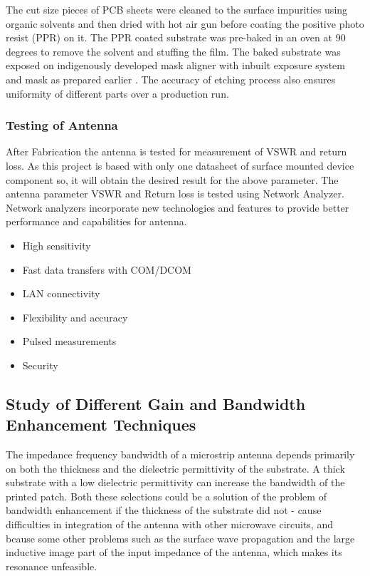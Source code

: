 The cut size pieces of PCB sheets were cleaned to the surface impurities using organic solvents and then dried with hot air gun before coating the positive photo resist (PPR) on it. The PPR coated substrate was pre-baked in an oven at 90 degrees to remove the solvent and stuffing the film. The baked substrate was exposed on indigenously developed mask aligner with inbuilt exposure system and mask as prepared earlier . The accuracy of etching process also ensures uniformity of different parts over a production run.

\cleardoublepage
\subsubsection{ Testing of Antenna}
\justify
After Fabrication the antenna is tested for measurement of VSWR and return loss. As this project is based with only one datasheet of surface mounted device component so, it will obtain the desired result for the above parameter. The antenna parameter VSWR and Return loss is tested using Network Analyzer. Network analyzers incorporate new technologies and features to provide better performance and capabilities for antenna.

\begin{itemize}
	\item High sensitivity
	\item Fast data transfers with COM/DCOM
	\item LAN connectivity
	\item Flexibility and accuracy
	\item Pulsed measurements
	\item Security
\end{itemize}
\cleardoublepage
\subsection{Study of Different Gain and Bandwidth Enhancement Techniques}
\justify
The impedance frequency bandwidth of a microstrip antenna depends primarily on both the thickness and the dielectric permittivity of the substrate. A thick substrate with a low dielectric permittivity can increase the bandwidth of the printed patch. Both these selections could be a solution of the problem of bandwidth enhancement if the thickness of the substrate did not - cause difficulties in integration of the antenna with other microwave circuits, and  bcause some other problems such as the surface wave propagation and the large inductive image part of the input impedance of the antenna, which makes its resonance unfeasible.
